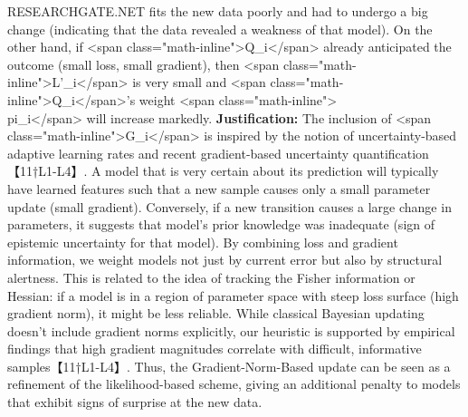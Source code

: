 \documentclass{article}
\begin{document}
RESEARCHGATE.NET
 fits the new data poorly and had to undergo a big change (indicating that the data revealed a weakness of that model). On the other hand, if <span class="math-inline">Q\_i</span> already anticipated the outcome (small loss, small gradient), then <span class="math-inline">L'\_i</span> is very small and <span class="math-inline">Q\_i</span>’s weight <span class="math-inline">\\pi\_i</span> will increase markedly. \textbf{Justification:} The inclusion of <span class="math-inline">G\_i</span> is inspired by the notion of uncertainty-based adaptive learning rates and recent gradient-based uncertainty quantification【11†L1-L4】. A model that is very certain about its prediction will typically have learned features such that a new sample causes only a small parameter update (small gradient). Conversely, if a new transition causes a large change in parameters, it suggests that model’s prior knowledge was inadequate (sign of epistemic uncertainty for that model). By combining loss and gradient information, we weight models not just by current error but also by structural alertness. This is related to the idea of tracking the Fisher information or Hessian: if a model is in a region of parameter space with steep loss surface (high gradient norm), it might be less reliable. While classical Bayesian updating doesn’t include gradient norms explicitly, our heuristic is supported by empirical findings that high gradient magnitudes correlate with difficult, informative samples【11†L1-L4】. Thus, the Gradient-Norm-Based update can be seen as a refinement of the likelihood-based scheme, giving an additional penalty to models that exhibit signs of surprise at the new data.
\end{document}
